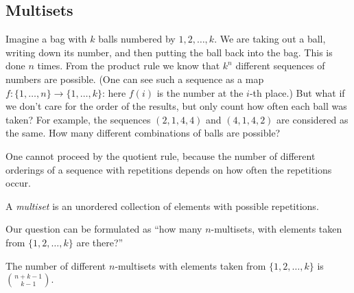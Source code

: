 \begin{page}
\setcounter{section}{3}
\setcounter{subsection}{6}
\setcounter{dfn}{13}
\label{portion:103}

\subsection{Multisets}
Imagine a bag with $k$ balls numbered by $1, 2, \ldots, k$.
We are taking out a ball, writing down its number, and then putting the ball back into the bag.
This is done $n$ times.
From the product rule we know that $k^n$ different sequences of numbers are possible.
(One can see such a sequence as a map $f \colon \{1, \ldots, n\} \to \{1, \ldots, k\}$: here $f(i)$ is the number at the $i$-th place.)
But what if we don't care for the order of the results, but only count how often each ball was taken?
For example, the sequences $(2, 1, 4, 4)$ and $(4, 1, 4, 2)$ are considered as the same.
How many different combinations of balls are possible?

One cannot proceed by the quotient rule, because the number of different orderings of a sequence with repetitions depends on how often the repetitions occur.


\end{page}

\begin{page}
\setcounter{section}{3}
\setcounter{subsection}{6}
\setcounter{dfn}{14}
\label{portion:105}

\begin{dfn}
A \emph{multiset} is an unordered collection of elements with possible repetitions.
\end{dfn}

\end{page}

\begin{page}
\setcounter{section}{3}
\setcounter{subsection}{6}
\setcounter{dfn}{14}
\label{portion:106}

Our question can be formulated as ``how many $n$-multisets, with elements taken from $\{1, 2, \ldots, k\}$ are there?''


\end{page}

\begin{page}
\setcounter{section}{3}
\setcounter{subsection}{6}
\setcounter{dfn}{15}
\label{portion:108}

\begin{thm}
The number of different $n$-multisets with elements taken from $\{1, 2, \ldots, k\}$ is $\binom{n+k-1}{k-1}$.
\end{thm}

\end{page}

